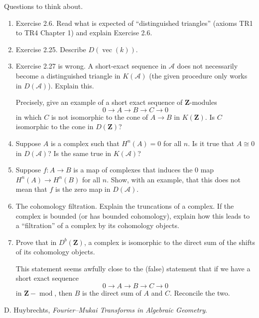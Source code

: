 \documentclass{amsart}
\begin{document}
Questions to think about.
\begin{enumerate}
\item Exercise 2.6. Read what is expected of ``distinguished triangles'' (axioms TR1 to TR4 Chapter 1) and explain Exercise 2.6.
\item Exercise 2.25.  Describe \(D(\operatorname{vec} (k))\).

\item Exercise 2.27 is wrong.  A short-exact sequence in \(\mathcal{A}\) does not necessarily become a distinguished triangle in \(K(\mathcal{A})\) (the given procedure only works in \(D(\mathcal{A})\)).  Explain this.

  Precisely, give an example of a short exact sequence of \(\mathbf{Z}\)-modules
  \[ 0 \to A \to B \to C \to 0\]
  in which \(C\) is not isomorphic to the cone of \(A \to B\) in \(K(\mathbf{Z})\).
  Is \(C\) isomorphic to the cone in \(D(\mathbf{Z})\)?

\item Suppose \(A\) is a complex such that \(H^n(A) = 0\) for all \(n\).
  Is it true that \(A \cong 0\) in \(D(\mathcal{A})\)?
  Is the same true in \(K(\mathcal{A})\)?

\item Suppose \(f \colon A \to B\) is a  map of complexes that induces the \(0\) map \(H^n(A) \to H^n(B)\) for all \(n\).
  Show, with an example, that this does not mean that \(f\) is the zero map in \(D(\mathcal{A})\).

\item The cohomology filtration.
  Explain the truncations of a complex.
  If the complex is bounded (or has bounded cohomology), explain how this leads to a ``filtration'' of a complex by its cohomology objects.

\item Prove that in \(D^b(\mathbf{Z})\), a complex is isomorphic to the direct sum of the shifts of its cohomology objects.

  This statement seems awfully close to the (false) statement that if we have a short exact sequence
\[ 0 \to A \to B \to C \to 0\]
in \(\mathbf{Z}-\operatorname{mod}\), then \(B\) is the direct sum of \(A\) and \(C\).
Reconcile the two.
  
\end{enumerate}



\begin{thebibliography}{1}
   D. Huybrechts, \emph{Fourier--Mukai Transforms in Algebraic Geometry}.
\end{thebibliography}
\end{document}
